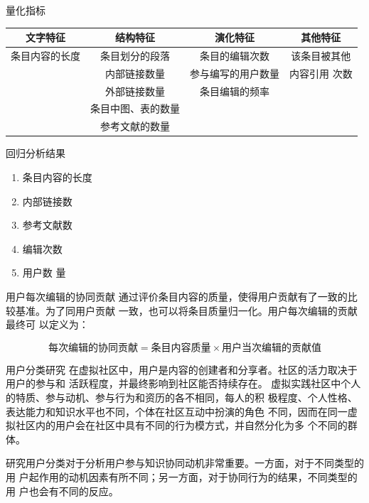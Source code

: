 \documentclass[slidestop,compress,mathserif,table]{beamer}
\begin{document}
 \begin{frame}{量化指标}
\scriptsize
   \begin{tabular}{|c|c|c|c|}
 \hline
    文字特征&结构特征&演化特征&其他特征\\\hline
    条目内容的长度&条目划分的段落&条目的编辑次数&该条目被其他\\
 &内部链接数量&参与编写的用户数量&内容引用
    次数\\
 &外部链接数量&条目编辑的频率& \\
 &条目中图、表的数量& &\\
  &参考文献的数量&& \\\hline
  \end{tabular}
\pause
\begin{block}{回归分析结果}
  \begin{enumerate}
  \item 条目内容的长度
\item 内部链接数
\item 参考文献数
\item 编辑次数
\item 用户数
量
  \end{enumerate}
\end{block}
 \end{frame}

 \begin{frame}{用户每次编辑的协同贡献}
   \vfill
通过评价条目内容的质量，使得用户贡献有了一致的比较基准。为了同用户贡献
一致，也可以将条目质量归一化。用户每次编辑的贡献最终可
以定义为：
\begin{exampleblock}

  \[
\text{每次编辑的协同贡献}=\text{条目内容质量} \times  
\text{用户当次编辑的贡献值}
\]
\end{exampleblock}
\vfill
 \end{frame}


 \begin{frame}{用户分类研究}
   在虚拟社区中，用户是内容的创建者和分享者。社区的活力取决于用户的参与和
活跃程度，并最终影响到社区能否持续存在。
虚拟实践社区中个人的特质、参与动机、参与行为和资历的各不相同，每人的积
极程度、个人性格、表达能力和知识水平也不同，个体在社区互动中扮演的角色
不同，因而在同一虚拟社区内的用户会在社区中具有不同的行为模方式，并自然分化为多
个不同的群体。

研究用户分类对于分析用户参与知识协同动机非常重要。一方面，对于不同类型的用
户起作用的动机因素有所不同；另一方面，对于协同行为的结果，不同类型的用
户也会有不同的反应。
 \end{frame}
\end{document}
